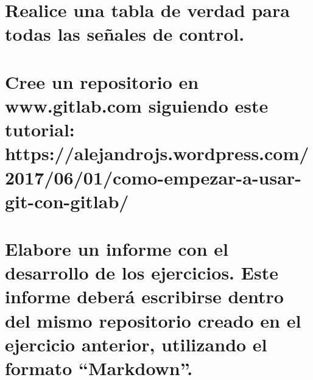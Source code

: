 \documentclass[11pt,a4paper]{article}
\begin{document}
\section{Realice una tabla de verdad para todas las señales de control.}

\section{Cree un repositorio en www.gitlab.com siguiendo este tutorial:
https://alejandrojs.wordpress.com/2017/06/01/como-empezar-a-usar-git-con-gitlab/}

\section{Elabore un informe con el desarrollo de los ejercicios. Este informe deberá
escribirse dentro del mismo repositorio creado en el ejercicio anterior, utilizando el
formato “Markdown”.}
\end{document}
